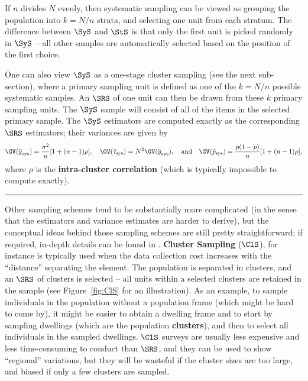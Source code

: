 If $n$ divides $N$ evenly, then systematic sampling can be viewed as grouping the population into $k=N/n$ strata, and selecting one unit from each stratum. The difference between $\SyS$ and $\StS$ is that only the first unit is picked randomly in $\SyS$ -- all other samples are automatically selected based on the position of the first choice. \par One can also view $\SyS$ as a one-stage cluster sampling (see the next sub-section), where a primary sampling unit is defined as one of the $k=N/n$ possible systematic samples. An $\SRS$ of one unit can then be drawn from these $k$ primary sampling units. The $\SyS$ sample will consist of all of the items in the selected primary sample.
\newl The $\SyS$ estimators are computed exactly as the corresponding $\SRS$ estimators; their variances are given by  
$$\GV(\overline{y}_{\textrm{sys}})=\frac{\sigma^2}{n}[1+(n-1)\rho],\quad  \GV(\hat{\tau}_{\textrm{sys}})=N^2\GV(\overline{y}_{\textrm{sys}}),\quad\mbox{and}\quad \GV(\hat{p}_{\textrm{sys}})=\frac{p(1-p)}{n}[1+(n-1)\rho],$$ where $\rho$ is the \textbf{intra-cluster correlation} (which is typically impossible to compute exactly). 
\begin{center}
    \rule{0.5\textwidth}{.4pt}
\end{center}
Other sampling schemes tend to be substantially more complicated (in the sense that the estimators and variance estimates are harder to derive), but the conceptual ideas behind those sampling schemes are still pretty straightforward; if required, in-depth details can be found in \cite{DC_SC}.
\newl \textbf{Cluster Sampling}
 ($\ClS$), for instance is typically used when the data collection cost increases with the ``distance'' separating the element. The population is separated in clusters, and an $\SRS$ of clusters is selected -- all units within a selected clusters are retained in the sample (see Figure~\ref{fig:ClS} for an illustration). As an example, to sample individuals in the population without a population frame (which might be hard to come by), it might be easier to obtain a dwelling frame and to start by sampling dwellings (which are the population \textbf{clusters}), and then to select all individuals in the sampled dwellings. $\ClS$ surveys are usually less expensive and less time-consuming to conduct than $\SRS$, and they can be used to show ``regional'' variations, but they will be wasteful if the cluster sizes are too large, and biased if only a few clusters are sampled.  
 

